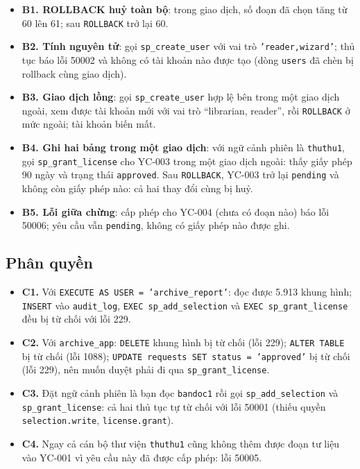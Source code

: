 \begin{itemize}
    \item \textbf{B1. ROLLBACK huỷ toàn bộ}: trong giao dịch, số đoạn đã chọn tăng từ 60 lên 61;
    sau \texttt{ROLLBACK} trở lại 60.
    \item \textbf{B2. Tính nguyên tử}: gọi \texttt{sp\_create\_user} với vai trò
    \texttt{'reader,wizard'}; thủ tục báo lỗi 50002 và không có tài khoản nào được tạo
    (dòng \texttt{users} đã chèn bị rollback cùng giao dịch).
    \item \textbf{B3. Giao dịch lồng}: gọi \texttt{sp\_create\_user} hợp lệ bên trong một giao
    dịch ngoài, xem được tài khoản mới với vai trò ``librarian, reader'', rồi
    \texttt{ROLLBACK} ở mức ngoài; tài khoản biến mất.
    \item \textbf{B4. Ghi hai bảng trong một giao dịch}: với ngữ cảnh phiên là
    \texttt{thuthu1}, gọi \texttt{sp\_grant\_license} cho YC-003 trong một giao dịch ngoài:
    thấy giấy phép 90 ngày và trạng thái \texttt{approved}. Sau \texttt{ROLLBACK}, YC-003 trở
    lại \texttt{pending} và không còn giấy phép nào: cả hai thay đổi cùng bị huỷ.
    \item \textbf{B5. Lỗi giữa chừng}: cấp phép cho YC-004 (chưa có đoạn nào) báo lỗi 50006;
    yêu cầu vẫn \texttt{pending}, không có giấy phép nào được ghi.
\end{itemize}

\subsection{Phân quyền}

\begin{itemize}
    \item \textbf{C1.} Với \texttt{EXECUTE AS USER = 'archive\_report'}: đọc được 5.913 khung hình;
    \texttt{INSERT} vào \texttt{audit\_log}, \texttt{EXEC sp\_add\_selection} và
    \texttt{EXEC sp\_grant\_license} đều bị từ chối với lỗi 229.
    \item \textbf{C2.} Với \texttt{archive\_app}: \texttt{DELETE} khung hình bị từ chối (lỗi 229);
    \texttt{ALTER TABLE} bị từ chối (lỗi 1088); \texttt{UPDATE requests SET status =
    'approved'} bị từ chối (lỗi 229), nên muốn duyệt phải đi qua \texttt{sp\_grant\_license}.
    \item \textbf{C3.} Đặt ngữ cảnh phiên là bạn đọc \texttt{bandoc1} rồi gọi
    \texttt{sp\_add\_selection} và \texttt{sp\_grant\_license}: cả hai thủ tục tự từ chối với
    lỗi 50001 (thiếu quyền \texttt{selection.write}, \texttt{license.grant}).
    \item \textbf{C4.} Ngay cả cán bộ thư viện \texttt{thuthu1} cũng không thêm được đoạn tư liệu
    vào YC-001 vì yêu cầu này đã được cấp phép: lỗi 50005.
\end{itemize}

